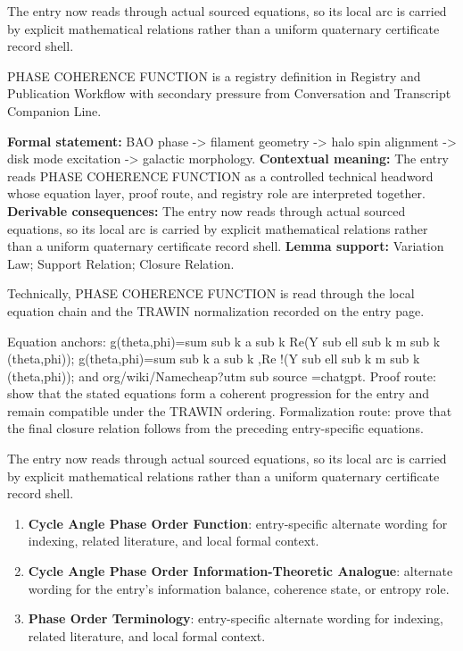 The entry now reads through actual sourced equations, so its local arc is carried by explicit mathematical relations rather than a uniform quaternary certificate record shell.
\clearpage


\begingroup\small
{}
PHASE COHERENCE FUNCTION is a registry definition in Registry and Publication Workflow with secondary pressure from Conversation and Transcript Companion Line.

\begingroup\footnotesize\setlength{\emergencystretch}{3em}\sloppy
\textbf{Formal statement:} BAO phase -> filament geometry -> halo spin alignment -> disk mode excitation -> galactic morphology. \textbf{Contextual meaning:} The entry reads PHASE COHERENCE FUNCTION as a controlled technical headword whose equation layer, proof route, and registry role are interpreted together. \textbf{Derivable consequences:} The entry now reads through actual sourced equations, so its local arc is carried by explicit mathematical relations rather than a uniform quaternary certificate record shell. \textbf{Lemma support:} Variation Law; Support Relation; Closure Relation.\par
\endgroup

Technically, PHASE COHERENCE FUNCTION is read through the local equation chain and the TRAWIN normalization recorded on the entry page.

Equation anchors: g(theta,phi)=sum sub k a sub k Re(Y sub ell sub k m sub k (theta,phi)); g(theta,phi)=sum sub k a sub k ,Re !(Y sub ell sub k m sub k (theta,phi)); and org/wiki/Namecheap?utm sub source =chatgpt. Proof route: show that the stated equations form a coherent progression for the entry and remain compatible under the TRAWIN ordering. Formalization route: prove that the final closure relation follows from the preceding entry-specific equations.

The entry now reads through actual sourced equations, so its local arc is carried by explicit mathematical relations rather than a uniform quaternary certificate record shell.
\endgroup

\begin{enumerate}[leftmargin=1.6em,itemsep=6pt,topsep=4pt]
\item \textbf{Cycle Angle Phase Order Function}: entry-specific alternate wording for indexing, related literature, and local formal context.
\item \textbf{Cycle Angle Phase Order Information-Theoretic Analogue}: alternate wording for the entry's information balance, coherence state, or entropy role.
\item \textbf{Phase Order Terminology}: entry-specific alternate wording for indexing, related literature, and local formal context.
\end{enumerate}

